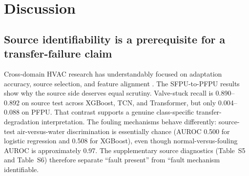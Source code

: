 \documentclass[preprint,12pt]{elsarticle}
\begin{document}
\begin{table}[H]
\centering
\caption{Ablation and structural-control results for the SFPU-to-PFPU experiment. Lower ECE/AURC is better; higher BA/F1 is better.}
\label{tab:ablation}
\scriptsize
{}
\end{table}

\section{Discussion}
\subsection{Source identifiability is a prerequisite for a transfer-failure claim}
Cross-domain HVAC research has understandably focused on adaptation accuracy, source selection, and feature alignment \cite{lei2025,zhang2025source,ghalamsiah2025can,ghalamsiah2026graph}. The SFPU-to-PFPU results show why the source side deserves equal scrutiny. Valve-stuck recall is 0.890--0.892 on source test across XGBoost, TCN, and Transformer, but only 0.004--0.088 on PFPU. That contrast supports a genuine class-specific transfer-degradation interpretation. The fouling mechanisms behave differently: source-test air-versus-water discrimination is essentially chance (AUROC 0.500 for logistic regression and 0.508 for XGBoost), even though normal-versus-fouling AUROC is approximately 0.97. The supplementary source diagnostics (Table~S5 and Table~S6) therefore separate ``fault present'' from ``fault mechanism identifiable.
\end{document}
